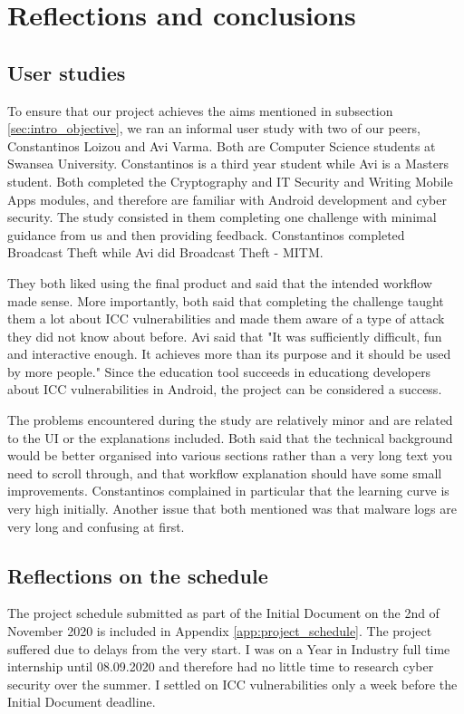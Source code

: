 \chapter{Reflections and conclusions}
	\label{chap:reflections}
	
	\section{User studies}
	    \label{sec:user_studies}
	    
	To ensure that our project achieves the aims mentioned in subsection \ref{sec:intro_objective}, we ran an informal user study with two of our peers, Constantinos Loizou and Avi Varma. Both are Computer Science students at Swansea University. Constantinos is a third year student while Avi is a Masters student. Both completed the Cryptography and IT Security and Writing Mobile Apps modules, and therefore are familiar with Android development and cyber security. The study consisted in them completing one challenge with minimal guidance from us and then providing feedback. Constantinos completed Broadcast Theft while Avi did Broadcast Theft - MITM.
	
	They both liked using the final product and said that the intended workflow made sense. More importantly, both said that completing the challenge taught them a lot about ICC vulnerabilities and made them aware of a type of attack they did not know about before. Avi said that "It was sufficiently difficult, fun and interactive enough. It achieves more than its purpose and it should be used by more people." Since the education tool succeeds in educationg developers about ICC vulnerabilities in Android, the project can be considered a success.
	
	The problems encountered during the study are relatively minor and are related to the UI or the explanations included. Both said that the technical background would be better organised into various sections rather than a very long text you need to scroll through, and that workflow explanation should have some small improvements. Constantinos complained in particular that the learning curve is very high initially. Another issue that both mentioned was that malware logs are very long and confusing at first.
	
	\section{Reflections on the schedule}
	    \label{sec:schedule_reflection}
	    
	The project schedule submitted as part of the Initial Document on the 2nd of November 2020 is included in Appendix \ref{app:project_schedule}. The project suffered due to delays from the very start. I was on a Year in Industry full time internship until 08.09.2020 and therefore had no little time to research cyber security over the summer. I settled on ICC vulnerabilities only a week before the Initial Document deadline.